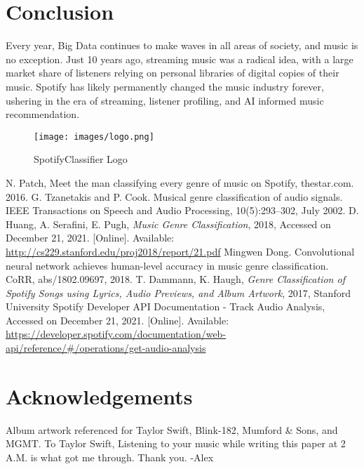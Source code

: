 \documentclass[conference]{IEEEtran}
\begin{document}
\section{Conclusion}
Every year, Big Data continues to make waves in all areas of society, and music is no exception. Just 10 years ago, streaming music was a radical idea, with a large market share of listeners relying on personal libraries of digital copies of their music. Spotify has likely permanently changed the music industry forever, ushering in the era of streaming, listener profiling, and AI informed music recommendation. 

\begin{figure}[htbp]
\centerline{\texttt{[image: images/logo.png]}}
\caption{SpotifyClassifier Logo}
\label{fig:logo}
\end{figure}


\pagebreak
\begin{thebibliography}{00}
 N. Patch, Meet the man classifying every genre of music on Spotify, thestar.com. 2016.
 G. Tzanetakis and P. Cook. Musical genre classification of audio signals. IEEE Transactions on Speech and Audio Processing, 10(5):293–302, July 2002.
 D. Huang, A. Serafini, E. Pugh, \emph{Music Genre Classification}, 2018, Accessed on December 21, 2021. [Online]. Available: \url{http://cs229.stanford.edu/proj2018/report/21.pdf}
 Mingwen Dong. Convolutional neural network achieves human-level accuracy in music genre classification. CoRR, abs/1802.09697, 2018.
 T. Dammann, K. Haugh, \emph{Genre Classification of Spotify Songs using Lyrics, Audio Previews, and Album Artwork}, 2017, Stanford University
 Spotify Developer API Documentation - Track Audio Analysis, Accessed on December 21, 2021. [Online]. Available: \url{ https://developer.spotify.com/documentation/web-api/reference/#/operations/get-audio-analysis}

\end{thebibliography}

\section*{Acknowledgements}
Album artwork referenced for Taylor Swift, Blink-182, Mumford \& Sons, and MGMT.
\newline
\newline
To Taylor Swift,
\newline
\newline
Listening to your music while writing this paper at 2 A.M. 
is what got me through. 
\newline
\newline
Thank you.
\newline
\newline
-Alex
\end{document}
